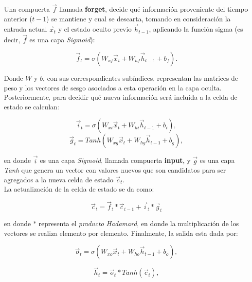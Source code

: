 Una compuerta $\vec{f}$ llamada \textbf{forget}, decide qué información proveniente del tiempo anterior ($t-1$) se mantiene y cual se descarta, tomando en consideración la entrada actual $\vec{x}_t$ y el estado oculto previo $\vec{h}_{t-1}$, aplicando la función sigma (es decir, $\vec{f}$ es una capa \emph{Sigmoid}):

\begin{equation}\label{eq:ft}
\vec{f}_t = \sigma(W_{xf}\vec{x}_t + W_{hf}\vec{h}_{t-1} + b_f).
\end{equation}

Donde $W$ y $b$, con sus correspondientes subíndices, representan las matrices de peso y los vectores de sesgo asociados a esta operación en la capa oculta. \\
Posteriormente, para decidir qué nueva información será incluida a la celda de estado se calculan:

\begin{equation}\label{eq:it}
\vec{i}_t = \sigma(W_{xi}\vec{x}_t + W_{hi}\vec{h}_{t-1} + b_i),
\end{equation}
\begin{equation}
  \label{eq:gt}
\vec{g}_t = Tanh(W_{xg}\vec{x}_t + W_{hg}\vec{h}_{t-1} + b_g),  
\end{equation}

\noindent en donde $\vec{i}$ es una capa \emph{Sigmoid}, llamada compuerta \textbf{input}, y $\vec{g}$ es una capa \emph{Tanh} que genera un vector con valores nuevos que son candidatos para ser agregados a la nueva celda de estado $\vec{c}_t$.
\\
La actualización de la celda de estado se da como:

\begin{equation}\label{eq:ct}
\vec{c}_t = \vec{f}_t \ast \vec{c}_{t-1} + \vec{i}_t \ast \vec{g}_t
\end{equation}

\noindent en donde $\ast$ representa el \emph{producto Hadamard}, en donde la multiplicación de los vectores se realiza elemento por elemento. Finalmente, la salida esta dada por:

\begin{equation}\label{eq:ot}
\vec{o}_t = \sigma(W_{xo}\vec{x}_t + W_{ho}\vec{h}_{t-1} + b_o),
\end{equation}

\begin{equation}\label{eq:ht}
\vec{h}_t = \vec{o}_t\ast Tanh(\vec{c}_t),
\end{equation}

